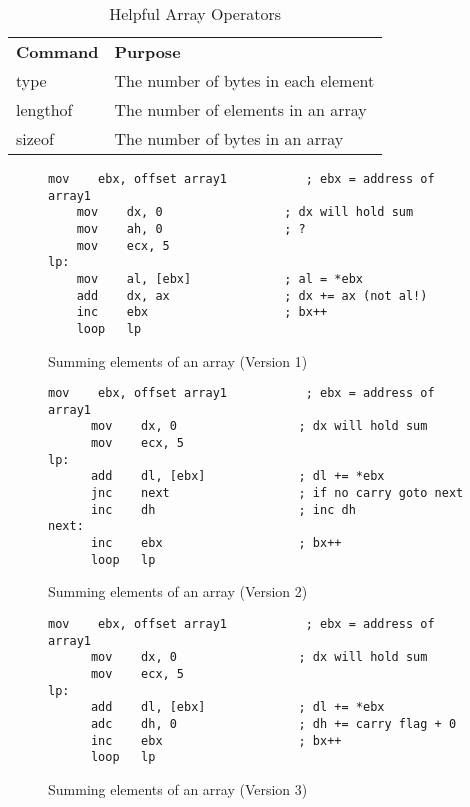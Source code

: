 \begin{table}[]
\begin{tabular}{ll}
\textbf{Command} & \textbf{Purpose}                    \\
type             & The number of bytes in each element \\
lengthof           & The number of elements in an array  \\
sizeof         & The number of bytes in an array    
\end{tabular}
\caption{Helpful Array Operators\label{tab:ArrayOps}}
\end{table}
\begin{figure}[t]
\begin{lstlisting}[language={[x86masm]Assembler},frame=single]
	mov    ebx, offset array1           ; ebx = address of array1
	mov    dx, 0                 ; dx will hold sum
	mov    ah, 0                 ; ?
	mov    ecx, 5
lp:
	mov    al, [ebx]             ; al = *ebx
	add    dx, ax                ; dx += ax (not al!)
	inc    ebx                   ; bx++
	loop   lp
\end{lstlisting}
\caption{Summing elements of an array (Version 1)\label{fig:SumArray1}}
\end{figure}
\begin{figure}[t]
\begin{lstlisting}[language={[x86masm]Assembler},frame=single]
      mov    ebx, offset array1           ; ebx = address of array1
      mov    dx, 0                 ; dx will hold sum
      mov    ecx, 5
lp:
      add    dl, [ebx]             ; dl += *ebx
      jnc    next                  ; if no carry goto next
      inc    dh                    ; inc dh
next:
      inc    ebx                   ; bx++
      loop   lp
\end{lstlisting}
\caption{Summing elements of an array (Version 2)\label{fig:SumArray2}}
\end{figure}
\begin{figure}[t]
\begin{lstlisting}[language={[x86masm]Assembler},frame=single]
      mov    ebx, offset array1           ; ebx = address of array1
      mov    dx, 0                 ; dx will hold sum
      mov    ecx, 5
lp:
      add    dl, [ebx]             ; dl += *ebx
      adc    dh, 0                 ; dh += carry flag + 0
      inc    ebx                   ; bx++
      loop   lp
\end{lstlisting}
\caption{Summing elements of an array (Version 3)\label{fig:SumArray3}}
\end{figure}

